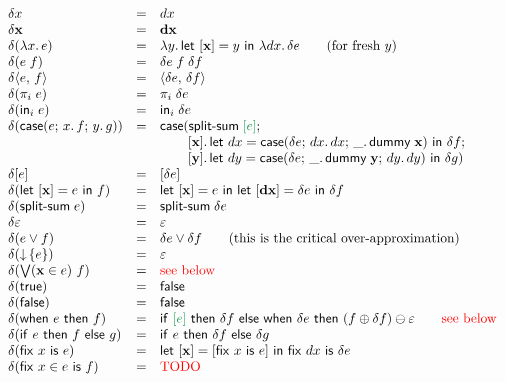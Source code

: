 \documentclass{article}
\newcommand{\dummy}{\ms{dummy}}
\begin{document}
\[
\begin{array}{lcll}
  \delta x &=& dx\\
  \delta \d{x} &=& \d{dx}\\
  \delta(\fn\bind{x} e) &=&
  \fn\bind{y} \letdisc{\d{x}}{y} {\fn\bind{dx} \delta e}
  \qquad\text{(for fresh $y$)}\\
  \delta(e\;f) &=& \delta e \; f \; \delta f\\
  \delta \pair{e}{f} &=& \pair{\delta{e}}{\delta{f}}\\
  \delta(\pi_i\; e) &=& \pi_i\; \delta{e}\\
  \delta(\inj{i}{e}) &=& \inj{i}{\delta{e}}\\
  \delta(\case{e}{x}{f}{y}{g})
  &=& \ms{case}(\splitsum{\color{ForestGreen}\disc{e}};\\
   && \phantom{\ms{case}\ }
      \bind{\disc{\d{x}}}
      \letv{dx}{\case{\delta e}{dx}{dx}{\_}{\dummy\;\d{x}}} \delta f;\\
   && \phantom{\ms{case}\ }
      \bind{\disc{\d{y}}}
      \letv{dy}{\case{\delta e}{\_}{\dummy\;\d{y}}{dy}{dy}} \delta g)\\
  \delta\disc{e} &=& \disc{\delta e}\\
  \delta(\letdisc{\d{x}}{e} f) &=&
  \letdisc{\d{x}}{e}
    \letdisc{\d{dx}}{\delta e} \delta f\\
  \delta(\splitsum{e}) &=&
  \splitsum{\delta e}\\
  \delta \unit &=& \unit\\
  \delta(e \vee f) &=& \delta e \vee \delta f
  \qquad \text{(this is the critical over-approximation)}\\
  \delta(\downintro{e}) &=& \unit\\
  \delta(\downelim{\d{x}}{e}{f}) &=& \text{\todo{see below}}\\
  \delta(\etrue) &=& \efalse\\
  \delta(\efalse) &=& \efalse\\
  \delta(\when{e}{f})
  &=& \ifthen{\color{ForestGreen} \disc{e}}{\delta f}{
    \when{\delta e}{(f \oplus \delta f) \ominus \unit}}
  \qquad \text{\color{red} see below}\\
  \delta(\ifthen{e}{f}{g}) &=& \ifthen{e}{\delta f}{\delta g}\\
  \delta(\fix{x}{e}) &=&
  \letdisc{\d{x}}{\disc{\fix{x} e}}{\fix{dx} \delta e}\\
  \delta(\fixin{x}{e}{f}) &=& \text{\TODO}
\end{array}
\]
\end{document}
